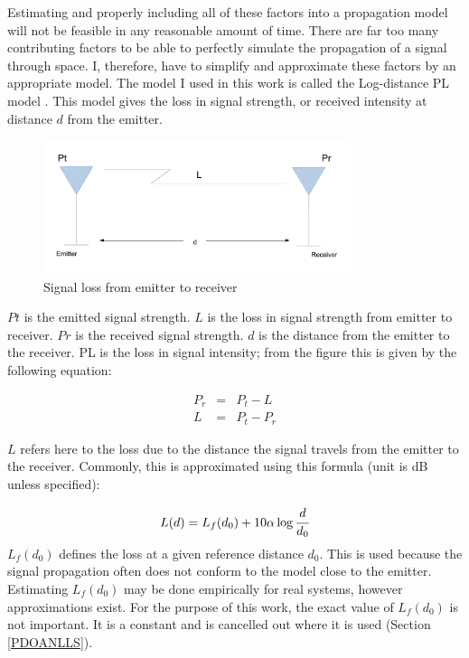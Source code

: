 \documentclass[10pt,a4paper]{book}
\begin{document}
Estimating and properly including all of these factors into a propagation model will not be feasible in any reasonable amount of time. There are far too many contributing factors to be able to perfectly simulate the propagation of a signal through space. I, therefore, have to simplify and approximate these factors by an appropriate model. The model I used in this work is called the Log-distance \gls{PL} model \citep{saunders2007antennas}. This model gives the loss in signal strength, or received intensity at distance $d$ from the emitter. 


\begin{figure}[H]
\centering
\includegraphics[width=90mm]{pathlossemitterreceiver.pdf}
\caption{Signal loss from emitter to receiver}
\label{pathlosstransmitterreceiver}
\end{figure}

$Pt$ is the emitted signal strength. $L$ is the loss in signal strength from emitter to receiver. $Pr$ is the received signal strength. $d$ is the distance from the emitter to the receiver. \Gls{PL} is the loss in signal intensity; from the figure this is given by the following equation:

\begin{eqnarray}
 P_r &=& P_t - L\\
 L &=& P_t - P_r
\end{eqnarray}


$L$ refers here to the loss due to the distance the signal travels from the emitter to the receiver. Commonly, this is approximated using this formula (unit is dB unless specified):

\begin{eqnarray}
 L(d) = L_f(d_0) + 10 \alpha \log \cfrac{d}{d_0}
\end{eqnarray}
$L_f(d_0)$ defines the loss at a given reference distance $d_0$. This is used because the signal propagation often does not conform to the model close to the emitter. Estimating $L_f(d_0)$ may be done empirically for real systems, however approximations exist. For the purpose of this work, the exact value of $L_f(d_0)$ is not important. It is a constant and is cancelled out where it is used (Section \ref{PDOANLLS}). 
\end{document}
